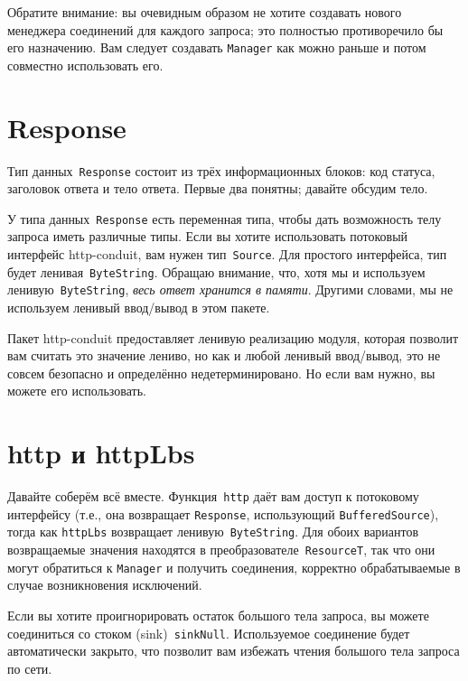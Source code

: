 Обратите внимание: вы очевидным образом не хотите создавать нового
менеджера соединений для каждого запроса; это полностью противоречило бы
его назначению. Вам следует создавать \lstinline!Manager! как можно
раньше и потом совместно использовать его.

\section{Response}
Тип данных~\lstinline!Response! состоит из трёх информационных блоков:
код статуса, заголовок ответа и тело ответа. Первые два понятны;
давайте обсудим тело.

У типа данных~\lstinline!Response! есть переменная типа, чтобы дать
возможность телу запроса иметь различные типы. Если вы хотите
использовать потоковый интерфейс http-conduit, вам нужен
тип~\lstinline!Source!. Для простого интерфейса, тип будет
ленивая~\lstinline!ByteString!. Обращаю внимание, что, хотя мы и
используем ленивую~\lstinline!ByteString!, \emph{весь ответ хранится в
памяти}. Другими словами, мы не используем ленивый ввод/вывод в этом
пакете.

\begin{remark}
Пакет http-conduit предоставляет ленивую реализацию модуля, которая
позволит вам считать это значение лениво, но как и любой ленивый
ввод/вывод, это не совсем безопасно и определённо недетерминировано. Но если
вам нужно, вы можете его использовать.
\end{remark}

\section{http и httpLbs}
Давайте соберём всё вместе. Функция~\lstinline!http! даёт вам доступ к
потоковому интерфейсу (т.е., она возвращает \lstinline!Response!,
использующий \lstinline!BufferedSource!), тогда как
\lstinline!httpLbs! возвращает ленивую~\lstinline!ByteString!. Для
обоих вариантов возвращаемые значения находятся в
преобразователе~\lstinline!ResourceT!, так что они могут
обратиться к \lstinline!Manager! и получить соединения, корректно
обрабатываемые в случае возникновения исключений.

\begin{remark}
Если вы хотите проигнорировать остаток большого тела запроса, вы
можете соединиться со стоком (sink)~\lstinline!sinkNull!. Используемое
соединение будет автоматически закрыто, что позволит вам избежать
чтения большого тела запроса по сети.
\end{remark}
